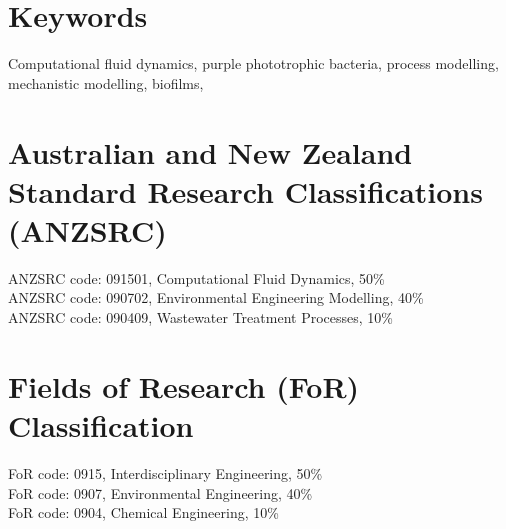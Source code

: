 
\section*{Keywords}

Computational fluid dynamics, purple phototrophic bacteria, process modelling, mechanistic modelling, biofilms, 

\section*{Australian and New Zealand Standard Research Classifications (ANZSRC)}


\noindent
ANZSRC code: 091501, Computational Fluid Dynamics, 50\% \\
ANZSRC code: 090702, Environmental Engineering Modelling, 40\% \\
ANZSRC code: 090409, Wastewater Treatment Processes, 10\%


\section*{Fields of Research (FoR) Classification}


FoR code: 0915, Interdisciplinary Engineering, 50\% \\
FoR code: 0907, Environmental Engineering, 40\% \\
FoR code: 0904, Chemical Engineering, 10\%
\clearpage

\pagestyle{headings}

\tableofcontents
	\clearpage
\listoffigures
	\clearpage
\listoftables



